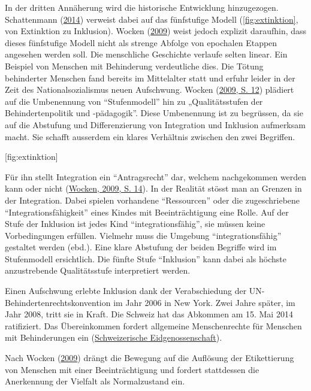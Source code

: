 \documentclass[
  ngerman,
  11pt,
  paper=a4,
  twoside,
  titlepage=true,
  openright,
  abstract=on,
  toc=listofnumbered,
  numbers=noenddot,
  chapterprefix=true,
  headings=optiontohead,
  svgnames,
  dvipsnames]{scrreprt}
\begin{document}
In der dritten Annäherung wird die historische Entwicklung hinzugezogen.
Schattenmann (\protect\hyperlink{ref-schattenmann_inklusion_2014}{2014})
verweist dabei auf das fünfstufige Modell (\cref{fig:extinktion}, von
Extinktion zu Inklusion). Wocken (\protect\hyperlink{ref-wocken}{2009})
weist jedoch explizit daraufhin, dass dieses fünfstufige Modell nicht
als strenge Abfolge von epochalen Etappen angesehen werden soll. Die
menschliche Geschichte verlaufe selten linear. Ein Beispiel von Menschen
mit Behinderung verdeutliche dies. Die Tötung behinderter Menschen fand
bereits im Mittelalter statt und erfuhr leider in der Zeit des
Nationalsozialismus neuen Aufschwung. Wocken
(\protect\hyperlink{ref-wocken}{2009, S. 12}) plädiert auf die
Umbenennung von “Stufenmodell” hin zu „Qualitätsstufen der
Behindertenpolitik und -pädagogik”. Diese Umbenennung ist zu begrüssen,
da sie auf die Abstufung und Differenzierung von Integration und
Inklusion aufmerksam macht. Sie schafft ausserdem ein klares Verhältnis
zwischen den zwei Begriffen.

[fig:extinktion]

Für ihn stellt Integration ein “Antragsrecht” dar, welchem nachgekommen
werden kann oder nicht (\protect\hyperlink{ref-wocken}{Wocken, 2009, S.
14}). In der Realität stösst man an Grenzen in der Integration. Dabei
spielen vorhandene “Ressourcen” oder die zugeschriebene
“Integrationsfähigkeit” eines Kindes mit Beeinträchtigung eine Rolle.
Auf der Stufe der Inklusion ist jedes Kind “integrationsfähig”, sie
müssen keine Vorbedingungen erfüllen. Vielmehr muss die Umgebung
“integrationsfähig” gestaltet werden (ebd.). Eine klare Abstufung der
beiden Begriffe wird im Stufenmodell ersichtlich. Die fünfte Stufe
“Inklusion” kann dabei als höchste anzustrebende Qualitätsstufe
interpretiert werden.

Einen Aufschwung erlebte Inklusion dank der Verabschiedung der
UN-Behindertenrechtskonvention im Jahr 2006 in New York. Zwei Jahre
später, im Jahr 2008, tritt sie in Kraft. Die Schweiz hat das Abkommen
am 15. Mai 2014 ratifiziert. Das Übereinkommen fordert allgemeine
Menschenrechte für Menschen mit Behinderungen ein
(\protect\hyperlink{ref-uno}{Schweizerische Eidgenossenschaft}).

Nach Wocken (\protect\hyperlink{ref-wocken}{2009}) drängt die Bewegung
auf die Auflösung der Etikettierung von Menschen mit einer
Beeinträchtigung und fordert stattdessen die Anerkennung der Vielfalt
als Normalzustand ein.
\end{document}
